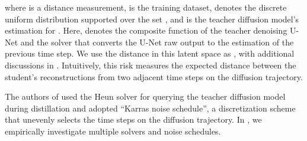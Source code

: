 \documentclass{article}
\begin{document}
where  is a distance measurement,  is the training dataset,  denotes the discrete uniform distribution supported over the set , and  is the teacher diffusion model's estimation for . Here,  denotes the composite function of the teacher denoising U-Net and the solver that converts the U-Net raw output to the estimation of the previous time step. We use the  distance in this latent space as , with additional discussions in . Intuitively, this risk measures the expected distance between the student's reconstructions from two adjacent time steps on the diffusion trajectory.

The authors of \cite{cm} used the Heun solver for querying the teacher diffusion model during distillation and adopted ``Karras noise schedule'', a discretization scheme that unevenly selects the time steps on the diffusion trajectory. In , we empirically investigate multiple solvers and noise schedules.
\end{document}
